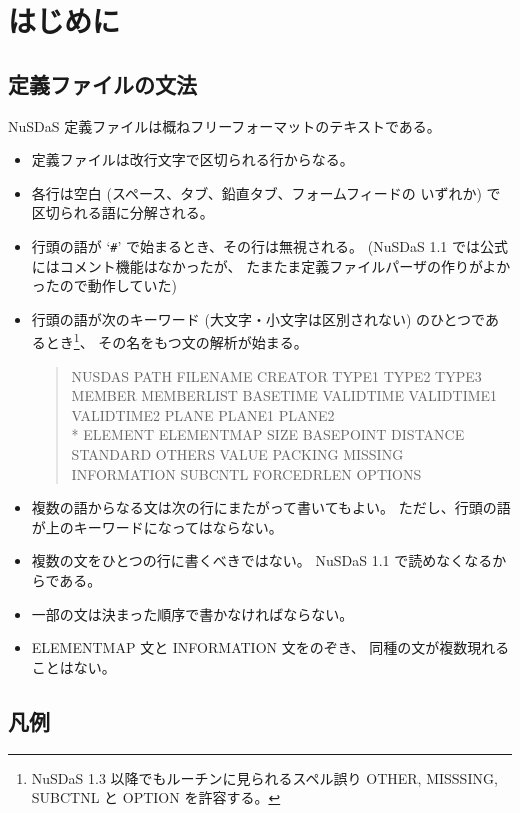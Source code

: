 \label{chap:deffile}

\section{はじめに}
\subsection{定義ファイルの文法}

NuSDaS 定義ファイルは概ねフリーフォーマットのテキストである。
\begin{itemize}
\item 定義ファイルは改行文字で区切られる行からなる。
\item 各行は空白 (スペース、タブ、鉛直タブ、フォームフィードの
	いずれか) で区切られる語に分解される。
\item 行頭の語が `{\tt \#}' で始まるとき、その行は無視される。
	(NuSDaS 1.1 では公式にはコメント機能はなかったが、
	たまたま定義ファイルパーザの作りがよかったので動作していた)
\item 行頭の語が次のキーワード (大文字・小文字は区別されない)
	のひとつであるとき\footnote{
		NuSDaS 1.3 以降でもルーチンに見られるスペル誤り
		OTHER, MISSSING, SUBCTNL と OPTION
		を許容する。
	}、
	その名をもつ文の解析が始まる。
\begin{quote}
NUSDAS PATH FILENAME CREATOR TYPE1 TYPE2 TYPE3 MEMBER {\nobreak MEMBERLIST}
BASETIME VALIDTIME VALIDTIME1 VALIDTIME2 PLANE PLANE1 PLANE2 \\*
ELEMENT ELEMENTMAP SIZE BASEPOINT DISTANCE STANDARD OTHERS VALUE PACKING
MISSING INFORMATION SUBCNTL FORCEDRLEN OPTIONS
\end{quote}
\item 複数の語からなる文は次の行にまたがって書いてもよい。
	ただし、行頭の語が上のキーワードになってはならない。
\item 複数の文をひとつの行に書くべきではない。
	NuSDaS 1.1 で読めなくなるからである。
\item 一部の文は決まった順序で書かなければならない。
\item ELEMENTMAP 文と INFORMATION 文をのぞき、
	同種の文が複数現れることはない。
\end{itemize}

\subsection{凡例}

